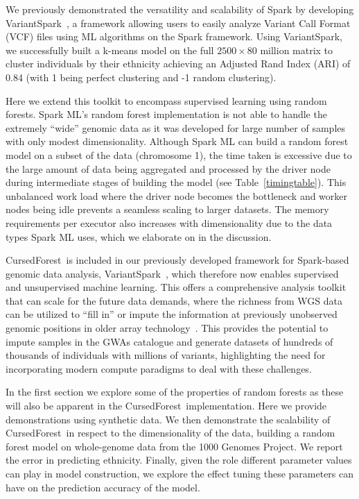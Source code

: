 \documentclass[10pt,letterpaper]{article}
\newcommand{\cursedforest}{{\sc CursedForest}}
\begin{document}
We previously demonstrated the versatility and scalability of Spark by developing VariantSpark~\cite{OBrien2015}, a
framework allowing users to easily analyze Variant Call Format (VCF) files using ML algorithms on the Spark framework.
Using VariantSpark, we successfully built a k-means model on the full $2500 \times 80$ million matrix to cluster
individuals by their ethnicity achieving an Adjusted Rand Index (ARI) of 0.84 (with 1 being perfect clustering and -1
random clustering).

Here we extend this toolkit to encompass supervised learning using random forests.  Spark ML's random forest
implementation is not able to handle the extremely ``wide'' genomic data as it was developed for large number of samples
with only modest dimensionality.  Although Spark ML can build a random forest model on a subset of the data (chromosome
1), the time taken is excessive due to the large amount of data being aggregated and processed by the driver node during
intermediate stages of building the model (see Table~\ref{timingtable}).  This unbalanced work load where the driver
node becomes the bottleneck and worker nodes being idle prevents a seamless scaling to larger datasets. The memory
requirements per executor also increases with dimensionality due to the data types Spark ML uses, which we elaborate on
in the discussion.

\cursedforest\ is included in our previously developed framework for Spark-based genomic data analysis,
VariantSpark~\cite{OBrien2015}, which therefore now enables supervised and unsupervised machine learning. This offers a
comprehensive analysis toolkit that can scale for the future data demands, where the richness from WGS data can be
utilized to ``fill in'' or impute the information at previously unobserved genomic positions in older array
technology~\cite{Howie2012}.  This provides the potential to impute samples in the GWAs catalogue and generate datasets
of hundreds of thousands of individuals with millions of variants, highlighting the need for incorporating modern
compute paradigms to deal with these challenges.

In the first section we explore some of the properties of random forests as these will also be apparent in the
\cursedforest\ implementation. Here we provide demonstrations using synthetic data.  We then demonstrate the scalability
of \cursedforest\ in respect to the dimensionality of the data, building a random forest model on whole-genome data from
the 1000 Genomes Project. We report the error in predicting ethnicity.  Finally, given the role
different parameter values can play in model construction, we explore the effect tuning these parameters can have on the
prediction accuracy of the model.
\end{document}
